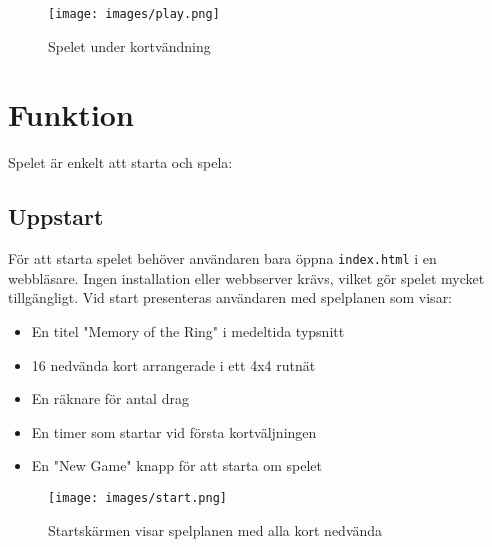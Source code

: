 \documentclass[a4paper,12pt]{article}
\begin{document}
\begin{figure}[h]
    \centering
    \texttt{[image: images/play.png]}
    \caption{Spelet under kortvändning}
    \label{fig:game_play}
\end{figure}

\section*{Funktion}
Spelet är enkelt att starta och spela:

\subsection*{Uppstart}
För att starta spelet behöver användaren bara öppna \texttt{index.html} i en webbläsare. Ingen installation eller webbserver krävs, vilket gör spelet mycket tillgängligt. Vid start presenteras användaren med spelplanen som visar:
\begin{itemize}
    \item En titel "Memory of the Ring" i medeltida typsnitt
    \item 16 nedvända kort arrangerade i ett 4x4 rutnät
    \item En räknare för antal drag
    \item En timer som startar vid första kortväljningen
    \item En "New Game" knapp för att starta om spelet
\end{itemize}

\begin{figure}[h]
    \centering
    \texttt{[image: images/start.png]}
    \caption{Startskärmen visar spelplanen med alla kort nedvända}
    \label{fig:game_start}
\end{figure}
\end{document}

